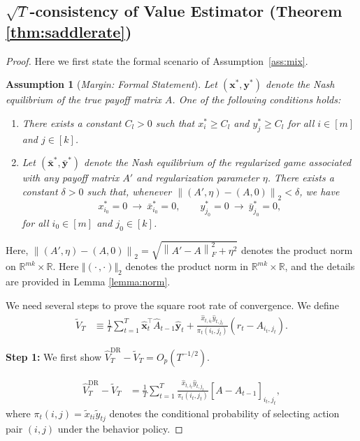 \documentclass[12pt]{article}
\newtheorem{assumption}{Assumption}[section]
\begin{document}
\subsection{$\sqrt{T}$-consistency of Value Estimator (Theorem \ref{thm:saddlerate})}
\label{app:dr}

\begin{proof}
Here we first state the formal scenario of Assumption~\ref{ass:mix}.
\begin{assumption}[{\emph{Margin: Formal Statement}}]
\label{ass:margin_formal}
Let $(\bm x^\ast,\bm y^\ast)$ denote the Nash equilibrium of the true payoff
matrix $A$. One of the following conditions holds:
\begin{enumerate}
    \item[\textnormal{(i)}]
    There exists a constant $C_l>0$ such that $x_i^\ast\ge C_l$ and $y_j^\ast\ge C_l$ for all $i\in[m]$ and $j\in[k]$.
    \item[\textnormal{(ii)}]
    Let $(\bar{\bm x}^\ast,\bar{\bm y}^\ast)$ denote the Nash equilibrium of the regularized game associated with any payoff matrix $A'$ and regularization parameter $\eta$. There exists a constant $\delta>0$ such that, whenever $\left\|(A',\eta)-(A,0)\right\|_2<\delta$, we have
    \[
    x_{i_0}^\ast=0
    \ \to\
    \bar x_{i_0}^\ast=0,
    \qquad
    y_{j_0}^\ast=0
    \ \to\
    \bar y_{j_0}^\ast=0,
    \]
    for all $i_0\in[m]$ and $j_0\in[k]$.
\end{enumerate}
\end{assumption}
Here, $\left\| (A',\eta)-(A,0) \right\|_2 = \sqrt{ \left\| A'-A \right\|_F^2 + \eta^2 }$ denotes the product norm on $\mathbb R^{mk}\times\mathbb R$.
Here $\Vert(\cdot\,,\cdot) \Vert_2$ denotes the product norm in $\mathbb{R}^{m k}\times \mathbb{R}$, and the details are provided in Lemma \ref{lemma:norm}. 

We need several steps to prove the square root rate of convergence. We define 
\begin{align*}
    \widetilde{V}_T &\equiv \frac{1}{T}\sum_{t=1}^T \widehat{\bm{x}}_t^\top \widehat{A}_{t-1}\widehat{\bm{y}}_t + \frac{\widehat{x}_{t,i_t}\widehat{y}_{t,j_t}}{{\pi}_t(i_t,j_t)}(r_t - A_{i_t,j_t}).
\end{align*}

\textbf{Step 1:} We first show $\widehat{V}_T^\text{DR} - \widetilde{V}_T = O_p(T^{-1/2})$.

\begin{align*} 
\widehat V_T^{\mathrm{DR}}-\widetilde V_T &= \frac{1}{T} \sum_{t=1}^T \frac{ \widehat{x}_{t,i_t}\widehat{y}_{t,j_t} }{ \pi_t(i_t,j_t) } \left[ A-\widehat A_{t-1} \right]_{i_t,j_t}, 
\end{align*} 
where $\pi_t(i,j) = \widetilde{x}_{ti}\widetilde{y}_{tj}$ denotes the conditional probability of selecting action pair $(i,j)$ under the behavior policy. 


\end{proof}
\end{document}
